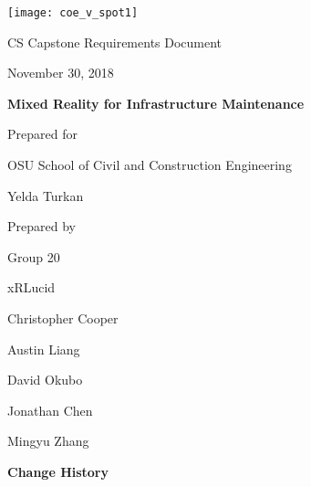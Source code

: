 \documentclass[onecolumn, draftclsnofoot,10pt, compsoc]{IEEEtran}
\def \CapstoneTeamName{		xRLucid}
\def \CapstoneTeamNumber{		20}
\def \GroupMemberOne{			Christopher Cooper}
\def \GroupMemberTwo{			Austin Liang}
\def \GroupMemberThree{			David Okubo}
\def \GroupMemberFour{			Jonathan Chen}
\def \GroupMemberFive{			Mingyu Zhang}
\def \CapstoneProjectName{		Mixed Reality for Infrastructure Maintenance}
\def \CapstoneSponsorCompany{	OSU School of Civil and Construction Engineering}
\def \CapstoneSponsorPerson{		Yelda Turkan}
\def \DocType{	%
				Requirements Document
				}
\newcommand{\NameSigPair}[1]{\par
\makebox[2.75in][r]{#1} \hfil 	\makebox[3.25in]{\makebox[2.25in]{\hrulefill} \hfill		\makebox[.75in]{\hrulefill}}
\par\vspace{-12pt} \textit{\tiny\noindent
\makebox[2.75in]{} \hfil		\makebox[3.25in]{\makebox[2.25in][r]{Signature} \hfill	\makebox[.75in][r]{Date}}}}
\renewcommand{\NameSigPair}[1]{#1}
\begin{document}
\begin{titlepage}
    \begin{singlespace}
    	\texttt{[image: coe\_v\_spot1]}
        \hfill 
        \par\vspace{.2in}
        \centering
        \scshape{
            \huge CS Capstone \DocType \par
            {\large November 30, 2018}\par
            \vspace{.5in}
            \textbf{\Huge\CapstoneProjectName}\par
            \vfill
            {\large Prepared for}\par
            \Huge \CapstoneSponsorCompany\par
            \vspace{5pt}
            {\Large\NameSigPair{\CapstoneSponsorPerson}\par}
            {\large Prepared by }\par
            Group\CapstoneTeamNumber\par
            \CapstoneTeamName\par 
            \vspace{5pt}
            {\Large
                \NameSigPair{\GroupMemberOne}\par
                \NameSigPair{\GroupMemberTwo}\par
                \NameSigPair{\GroupMemberThree}\par
                \NameSigPair{\GroupMemberFour}\par
                \NameSigPair{\GroupMemberFive}\par
            }
            \vspace{20pt}
        }

\end{singlespace}
\end{titlepage}
\newpage
{}
\tableofcontents
\listoffigures
\clearpage

\textbf{Change History}\par
\end{document}
